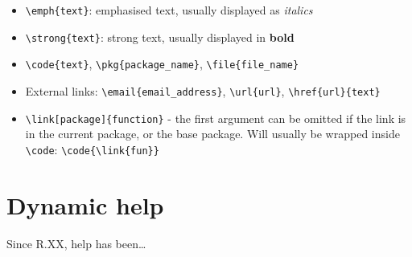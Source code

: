 \begin{itemize}
\item
  \texttt{\textbackslash{}emph\{text\}}: emphasised text, usually
  displayed as \emph{italics}
\item
  \texttt{\textbackslash{}strong\{text\}}: strong text, usually
  displayed in \textbf{bold}
\item
  \texttt{\textbackslash{}code\{text\}},
  \texttt{\textbackslash{}pkg\{package\_name\}},
  \texttt{\textbackslash{}file\{file\_name\}}
\item
  External links: \texttt{\textbackslash{}email\{email\_address\}},
  \texttt{\textbackslash{}url\{url\}},
  \texttt{\textbackslash{}href\{url\}\{text\}}
\item
  \texttt{\textbackslash{}link{[}package{]}\{function\}} - the first
  argument can be omitted if the link is in the current package, or the
  base package. Will usually be wrapped inside
  \texttt{\textbackslash{}code}:
  \texttt{\textbackslash{}code\{\textbackslash{}link\{fun\}\}}
\end{itemize}

\section{Dynamic help}

Since R.XX, help has been\ldots{}

